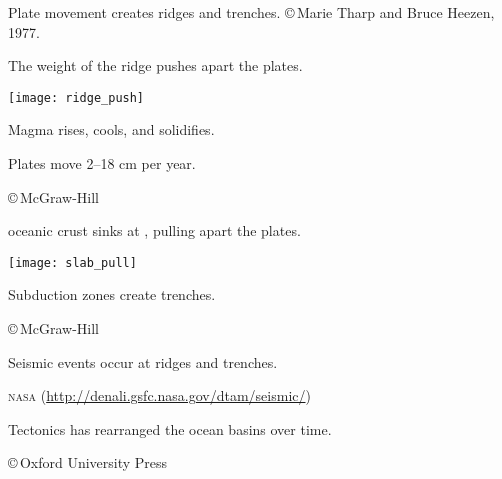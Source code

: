 \documentclass[t]{beamer}
\begin{document}
{
\begin{frame}[b]{Plate movement creates ridges and trenches.}
\hfill \tiny \copyright\,Marie Tharp and Bruce Heezen, 1977.
\end{frame}
}
%
\begin{frame}[t]{ The weight of the ridge pushes apart the plates.}

\begin{multicols}{2}

\texttt{[image: ridge\_push]}

\columnbreak

\hangpara Magma rises, cools, and solidifies.

\hangpara Plates move 2–18 cm per year.

\end{multicols}

\vfilll

\hfill \tiny \copyright\,McGraw-Hill

\end{frame}
%
\begin{frame}[t]{ oceanic crust sinks at , pulling apart the plates.}

\vspace*{-0.5\baselineskip}

\begin{multicols}{2}

\texttt{[image: slab\_pull]}

\columnbreak

\vspace*{4\baselineskip}

\hangpara Subduction zones create trenches.
\end{multicols}

\vfilll

\hfill \tiny \copyright\,McGraw-Hill

\end{frame}
%
{
\begin{frame}[b]{Seismic events occur at ridges and trenches.}

\hfill \tiny \textsc{nasa} (\url{http://denali.gsfc.nasa.gov/dtam/seismic/})

\end{frame}
}
%
{
\begin{frame}[b]{Tectonics has rearranged the ocean basins over time.}

\hfill	\tiny \copyright\,Oxford University Press

\end{frame}
}
\end{document}
